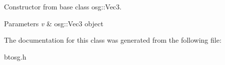 Constructor from base class osg\+::\+Vec3. 


\begin{DoxyParams}{Parameters}
{\em v} & osg\+::\+Vec3 object \\
\hline
\end{DoxyParams}


The documentation for this class was generated from the following file\+:\begin{DoxyCompactItemize}
\item 
btosg.\+h\end{DoxyCompactItemize}
